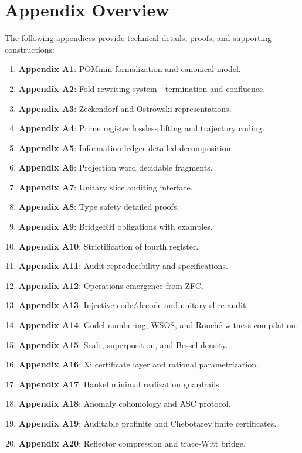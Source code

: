 \section*{Appendix Overview}

The following appendices provide technical details, proofs, and supporting constructions:

\begin{enumerate}
  \item \textbf{Appendix A1}: POMmin formalization and canonical model.
  \item \textbf{Appendix A2}: Fold rewriting system—termination and confluence.
  \item \textbf{Appendix A3}: Zeckendorf and Ostrowski representations.
  \item \textbf{Appendix A4}: Prime register lossless lifting and trajectory coding.
  \item \textbf{Appendix A5}: Information ledger detailed decomposition.
  \item \textbf{Appendix A6}: Projection word decidable fragments.
  \item \textbf{Appendix A7}: Unitary slice auditing interface.
  \item \textbf{Appendix A8}: Type safety detailed proofs.
  \item \textbf{Appendix A9}: BridgeRH obligations with examples.
  \item \textbf{Appendix A10}: Strictification of fourth register.
  \item \textbf{Appendix A11}: Audit reproducibility and specifications.
  \item \textbf{Appendix A12}: Operations emergence from ZFC.
  \item \textbf{Appendix A13}: Injective code/decode and unitary slice audit.
  \item \textbf{Appendix A14}: Gödel numbering, WSOS, and Rouché witness compilation.
  \item \textbf{Appendix A15}: Scale, superposition, and Bessel density.
  \item \textbf{Appendix A16}: Xi certificate layer and rational parametrization.
  \item \textbf{Appendix A17}: Hankel minimal realization guardrails.
  \item \textbf{Appendix A18}: Anomaly cohomology and ASC protocol.
  \item \textbf{Appendix A19}: Auditable profinite and Chebotarev finite certificates.
  \item \textbf{Appendix A20}: Reflector compression and trace-Witt bridge.

\end{enumerate}
